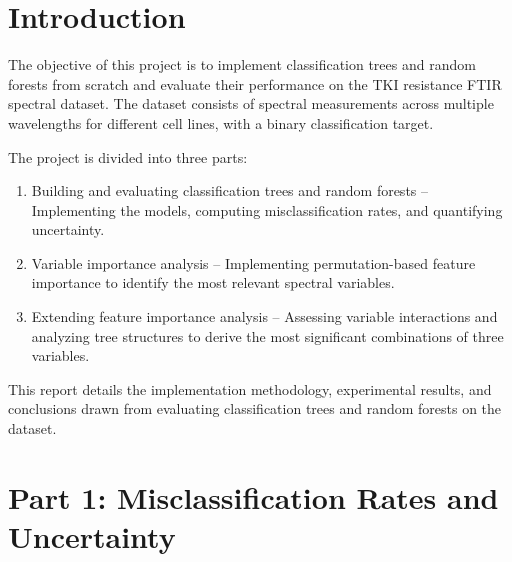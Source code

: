 \documentclass[fleqn,moreauthors,10pt]{ds_report}
\begin{document}
\flushbottom 

\maketitle 

\thispagestyle{empty} 


\section*{Introduction}

The objective of this project is to implement classification trees and random forests from scratch and evaluate their performance on the TKI resistance FTIR spectral dataset. The dataset consists of spectral measurements across multiple wavelengths for different cell lines, with a binary classification target.

The project is divided into three parts:

\begin{enumerate}
\item Building and evaluating classification trees and random forests – Implementing the models, computing misclassification rates, and quantifying uncertainty.
\item Variable importance analysis – Implementing permutation-based feature importance to identify the most relevant spectral variables.
\item Extending feature importance analysis – Assessing variable interactions and analyzing tree structures to derive the most significant combinations of three variables.
\end{enumerate}

This report details the implementation methodology, experimental results, and conclusions drawn from evaluating classification trees and random forests on the dataset.


\section*{Part 1: Misclassification Rates and Uncertainty}
\end{document}
